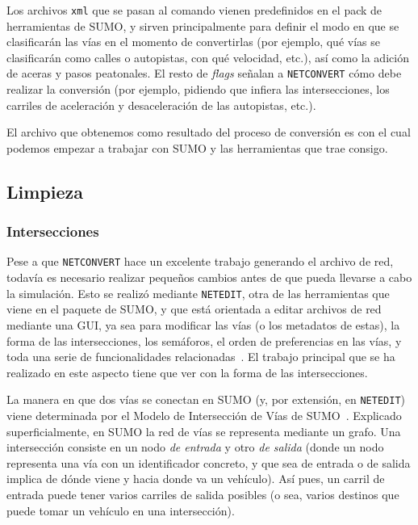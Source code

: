 
Los archivos \texttt{xml} que se pasan al comando vienen predefinidos en el pack de herramientas de SUMO, y sirven principalmente para definir el modo en que se clasificarán las vías en el momento de convertirlas (por ejemplo, qué vías se clasificarán como calles o autopistas, con qué velocidad, etc.), así como la adición de aceras y pasos peatonales. El resto de \textit{flags} señalan a \texttt{NETCONVERT} cómo debe realizar la conversión (por ejemplo, pidiendo que infiera las intersecciones, los carriles de aceleración y desaceleración de las autopistas, etc.).

El archivo que obtenemos como resultado del proceso de conversión es con el cual podemos empezar a trabajar con SUMO y las herramientas que trae consigo.

\subsection{Limpieza}

\subsubsection{Intersecciones}

Pese a que \texttt{NETCONVERT} hace un excelente trabajo generando el archivo de red, todavía es necesario realizar pequeños cambios antes de que pueda llevarse a cabo la simulación. Esto se realizó mediante \texttt{NETEDIT}, otra de las herramientas que viene en el paquete de SUMO, y que está orientada a editar archivos de red mediante una GUI, ya sea para modificar las vías (o los metadatos de estas), la forma de las intersecciones, los semáforos, el orden de preferencias en las vías, y toda una serie de funcionalidades relacionadas~\cite{noauthor_netedit_nodate}. El trabajo principal que se ha realizado en este aspecto tiene que ver con la forma de las intersecciones. 

La manera en que dos vías se conectan en SUMO (y, por extensión, en \texttt{NETEDIT}) viene determinada por el Modelo de Intersección de Vías de SUMO~\cite{erdmann_sumos_2014}. Explicado superficialmente, en SUMO la red de vías se representa mediante un grafo. Una intersección consiste en un nodo \textit{de entrada} y otro \textit{de salida} (donde un nodo representa una vía con un identificador concreto, y que sea de entrada o de salida implica de dónde viene y hacia donde va un vehículo). Así pues, un carril de entrada puede tener varios carriles de salida posibles (o sea, varios destinos que puede tomar un vehículo en una intersección).

